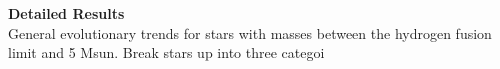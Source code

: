 \textbf{Detailed Results} \\
General evolutionary trends for stars with masses between the hydrogen fusion limit and 5 Msun. Break stars up into three categoi